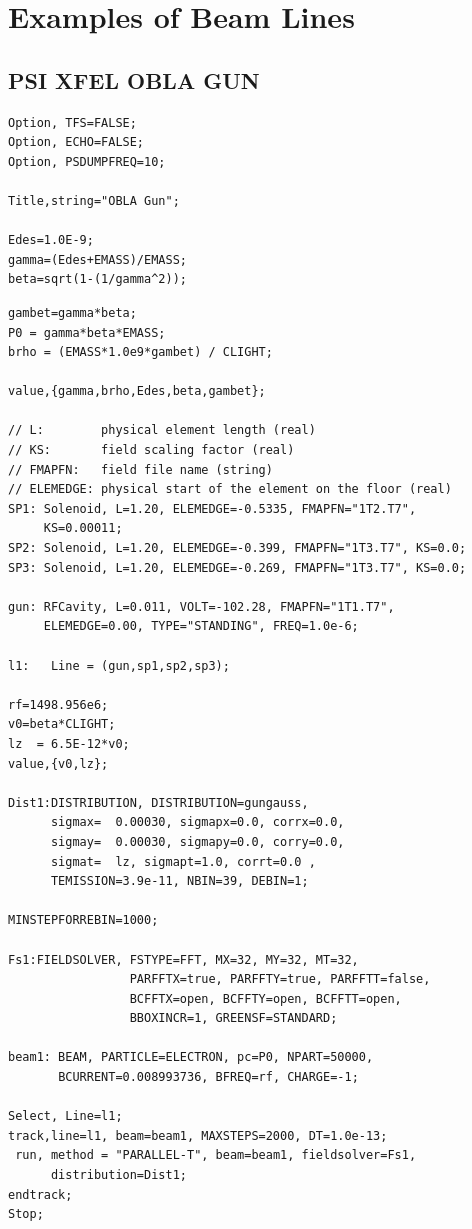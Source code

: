 \section{Examples of Beam Lines}


\subsection{PSI XFEL OBLA GUN}
\label{sec:oblagun}
\begin{fmpage}
\footnotesize
\begin{verbatim} 
Option, TFS=FALSE;
Option, ECHO=FALSE;
Option, PSDUMPFREQ=10;

Title,string="OBLA Gun";

Edes=1.0E-9;
gamma=(Edes+EMASS)/EMASS;
beta=sqrt(1-(1/gamma^2));
\end{verbatim}
\end{fmpage}
\begin{fmpage}
\begin{footnotesize}
\begin{verbatim}
gambet=gamma*beta;
P0 = gamma*beta*EMASS;
brho = (EMASS*1.0e9*gambet) / CLIGHT;

value,{gamma,brho,Edes,beta,gambet};

// L:        physical element length (real)
// KS:       field scaling factor (real)
// FMAPFN:   field file name (string)
// ELEMEDGE: physical start of the element on the floor (real)
SP1: Solenoid, L=1.20, ELEMEDGE=-0.5335, FMAPFN="1T2.T7",
     KS=0.00011;
SP2: Solenoid, L=1.20, ELEMEDGE=-0.399, FMAPFN="1T3.T7", KS=0.0;
SP3: Solenoid, L=1.20, ELEMEDGE=-0.269, FMAPFN="1T3.T7", KS=0.0;

gun: RFCavity, L=0.011, VOLT=-102.28, FMAPFN="1T1.T7", 
     ELEMEDGE=0.00, TYPE="STANDING", FREQ=1.0e-6;

l1:   Line = (gun,sp1,sp2,sp3); 

rf=1498.956e6;  
v0=beta*CLIGHT;
lz  = 6.5E-12*v0;
value,{v0,lz};

Dist1:DISTRIBUTION, DISTRIBUTION=gungauss,
      sigmax=  0.00030, sigmapx=0.0, corrx=0.0,
      sigmay=  0.00030, sigmapy=0.0, corry=0.0,
      sigmat=  lz, sigmapt=1.0, corrt=0.0 , 
      TEMISSION=3.9e-11, NBIN=39, DEBIN=1;

MINSTEPFORREBIN=1000;

Fs1:FIELDSOLVER, FSTYPE=FFT, MX=32, MY=32, MT=32, 
                 PARFFTX=true, PARFFTY=true, PARFFTT=false,
                 BCFFTX=open, BCFFTY=open, BCFFTT=open, 
                 BBOXINCR=1, GREENSF=STANDARD;

beam1: BEAM, PARTICLE=ELECTRON, pc=P0, NPART=50000, 
       BCURRENT=0.008993736, BFREQ=rf, CHARGE=-1;

Select, Line=l1;
track,line=l1, beam=beam1, MAXSTEPS=2000, DT=1.0e-13;
 run, method = "PARALLEL-T", beam=beam1, fieldsolver=Fs1, 
      distribution=Dist1;
endtrack;
Stop;
\end{verbatim}
\end{footnotesize}
\end{fmpage}

